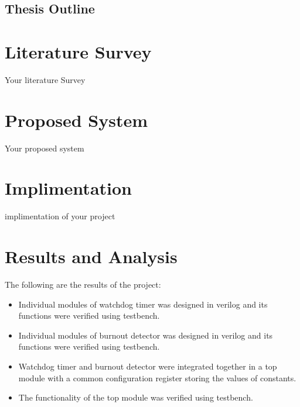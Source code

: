 \documentclass[10pt]{report}
\begin{document}
\section{Thesis Outline}

\newpage

\chapter{Literature Survey}

Your literature Survey

\newpage

\chapter{Proposed System}
Your proposed system
\newpage

\chapter{Implimentation}
implimentation of your project
\newpage

\chapter{Results and Analysis}

The following are the results of the project:
\begin{itemize}
    \item Individual modules of watchdog timer was designed in verilog and its functions were verified using testbench.
    \item Individual modules of burnout detector was designed in verilog and its functions were verified using testbench.
    \item Watchdog timer and burnout detector were integrated together in a top module with a common configuration register storing the values of constants.
    \item The functionality of the top module was verified using testbench.
    
\end{itemize}
\end{document}
